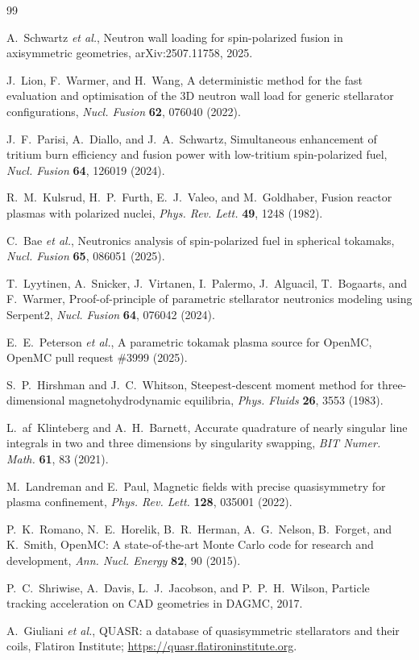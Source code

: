 \documentclass[11pt]{article}
\begin{document}
\begin{thebibliography}{99}

A.~Schwartz \emph{et al.}, Neutron wall loading for spin-polarized fusion in axisymmetric
geometries, arXiv:2507.11758, 2025.

J.~Lion, F.~Warmer, and H.~Wang, A deterministic method for the fast evaluation and
optimisation of the 3D neutron wall load for generic stellarator configurations,
\emph{Nucl. Fusion} \textbf{62}, 076040 (2022).

J.~F.~Parisi, A.~Diallo, and J.~A.~Schwartz, Simultaneous enhancement of tritium burn
efficiency and fusion power with low-tritium spin-polarized fuel, \emph{Nucl. Fusion}
\textbf{64}, 126019 (2024).

R.~M.~Kulsrud, H.~P.~Furth, E.~J.~Valeo, and M.~Goldhaber,
Fusion reactor plasmas with polarized nuclei,
\emph{Phys. Rev. Lett.} \textbf{49}, 1248 (1982).

C.~Bae \emph{et al.}, Neutronics analysis of spin-polarized fuel in spherical tokamaks,
\emph{Nucl. Fusion} \textbf{65}, 086051 (2025).

T.~Lyytinen, A.~Snicker, J.~Virtanen, I.~Palermo, J.~Alguacil, T.~Bogaarts, and F.~Warmer,
Proof-of-principle of parametric stellarator neutronics modeling using Serpent2,
\emph{Nucl. Fusion} \textbf{64}, 076042 (2024).

E.~E.~Peterson \emph{et al.}, A parametric tokamak plasma source for OpenMC, OpenMC pull
request \#3999 (2025).

S.~P.~Hirshman and J.~C.~Whitson, Steepest-descent moment method for three-dimensional
magnetohydrodynamic equilibria, \emph{Phys. Fluids} \textbf{26}, 3553 (1983).

L.~af~Klinteberg and A.~H.~Barnett, Accurate quadrature of nearly singular line integrals in
two and three dimensions by singularity swapping, \emph{BIT Numer. Math.} \textbf{61}, 83
(2021).

M.~Landreman and E.~Paul, Magnetic fields with precise quasisymmetry for plasma
confinement, \emph{Phys. Rev. Lett.} \textbf{128}, 035001 (2022).

P.~K.~Romano, N.~E.~Horelik, B.~R.~Herman, A.~G.~Nelson, B.~Forget, and K.~Smith,
OpenMC: A state-of-the-art Monte Carlo code for research and development,
\emph{Ann. Nucl. Energy} \textbf{82}, 90 (2015).

P.~C.~Shriwise, A.~Davis, L.~J.~Jacobson, and P.~P.~H.~Wilson,
Particle tracking acceleration on CAD geometries in DAGMC, 2017.

A.~Giuliani \emph{et al.}, QUASR: a database of quasisymmetric stellarators and their
coils, Flatiron Institute; \url{https://quasr.flatironinstitute.org}.

\end{thebibliography}
\end{document}
